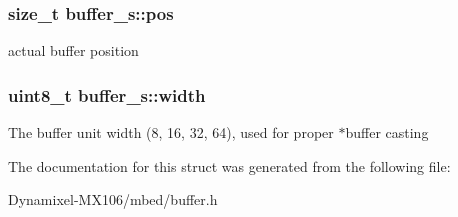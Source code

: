 \subsubsection[{\texorpdfstring{pos}{pos}}]{\setlength{\rightskip}{0pt plus 5cm}size\+\_\+t buffer\+\_\+s\+::pos}\hypertarget{structbuffer__s_a7b83c0750f3dc1aa729e2bafaaef3851}{}\label{structbuffer__s_a7b83c0750f3dc1aa729e2bafaaef3851}
actual buffer position 
\subsubsection[{\texorpdfstring{width}{width}}]{\setlength{\rightskip}{0pt plus 5cm}uint8\+\_\+t buffer\+\_\+s\+::width}\hypertarget{structbuffer__s_ade001f85e94113a6781eb6e09731bf09}{}\label{structbuffer__s_ade001f85e94113a6781eb6e09731bf09}
The buffer unit width (8, 16, 32, 64), used for proper $\ast$buffer casting 

The documentation for this struct was generated from the following file\+:\begin{DoxyCompactItemize}
\item 
Dynamixel-\/\+M\+X106/mbed/buffer.\+h\end{DoxyCompactItemize}
